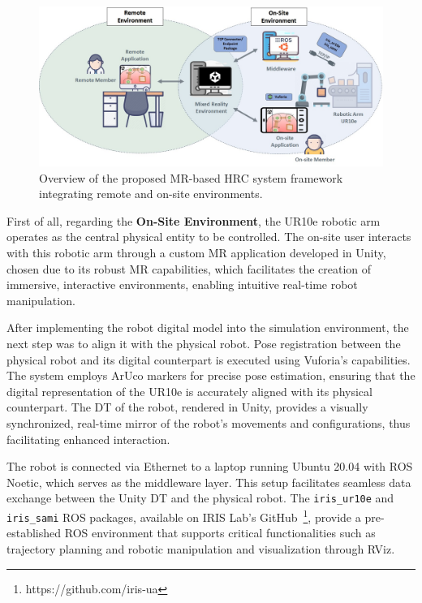 \begin{figure}[h]
    \centering
    \includegraphics[width=\linewidth]{figs/framework-1.jpeg}
    \caption{Overview of the proposed \ac{MR}-based \ac{HRC} system framework integrating remote and on-site environments.}
    \label{fig:project_framework}
\end{figure}

First of all, regarding the \textbf{On-Site Environment}, the UR10e robotic arm operates as the central physical entity to be controlled. The on-site user interacts with this robotic arm through a custom \ac{MR} application developed in Unity, chosen due to its robust \ac{MR} capabilities, which facilitates the creation of immersive, interactive environments, enabling intuitive real-time robot manipulation.

After implementing the robot digital model into the simulation environment, the next step was to align it with the physical robot. Pose registration between the physical robot and its digital counterpart is executed using Vuforia's capabilities. The system employs ArUco markers for precise pose estimation, ensuring that the digital representation of the UR10e is accurately aligned with its physical counterpart. The \ac{DT} of the robot, rendered in Unity, provides a visually synchronized, real-time mirror of the robot's movements and configurations, thus facilitating enhanced interaction.

The robot is connected via Ethernet to a laptop running Ubuntu 20.04 with \ac{ROS} Noetic, which serves as the middleware layer. This setup facilitates seamless data exchange between the Unity \ac{DT} and the physical robot. The \texttt{iris\_ur10e} and \texttt{iris\_sami} \ac{ROS} packages, available on IRIS Lab's GitHub~\footnote{https://github.com/iris-ua}, provide a pre-established \ac{ROS} environment that supports critical functionalities such as trajectory planning and robotic manipulation and visualization through RViz.

